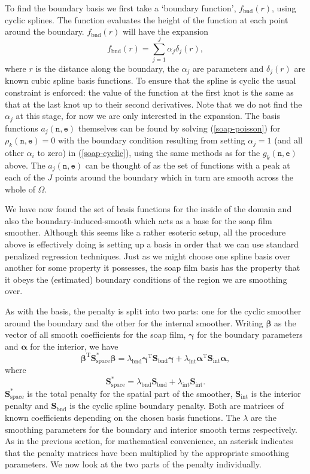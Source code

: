 To find the boundary basis we first take a `boundary function', $f_\text{bnd}(r)$, using cyclic splines. The function evaluates the height of the function at each point around the boundary. $f_\text{bnd}(r)$ will have the expansion
\begin{equation}
f_\text{bnd}(r)=\sum_{j=1}^J \alpha_j \delta_j(r),
\label{soap-cyclic}
\end{equation}
where $r$ is the distance along the boundary, the $\alpha_j$ are parameters and $\delta_j(r)$ are known cubic spline basis functions. To ensure that the spline is cyclic the usual constraint is enforced: the value of the function at the first knot is the same as that at the last knot up to their second derivatives. Note that we do not find the $\alpha_j$ at this stage, for now we are only interested in the expansion. The basis functions $a_j(\texttt{n},\texttt{e})$ themselves can be found by solving (\ref{soap-poisson}) for $\rho_k(\texttt{n},\texttt{e})= 0$ with the boundary condition resulting from setting $\alpha_j=1$ (and all other $\alpha_i$ to zero) in (\ref{soap-cyclic}), using the same methods as for the $g_k(\texttt{n},\texttt{e})$ above. The $a_j(\texttt{n},\texttt{e})$ can be thought of as the set of functions with a peak at each of the $J$ points around the boundary which in turn are smooth across the whole of $\Omega$.

We have now found the set of basis functions for the inside of the domain and also the boundary-induced-smooth which acts as a base for the soap film smoother. Although this seems like a rather esoteric setup, all the procedure above is effectively doing is setting up a basis in order that we can use standard penalized regression techniques. Just as we might choose one spline basis over another for some property it possesses, the soap film basis has the property that it obeys the (estimated) boundary conditions of the region we are smoothing over.

As with the basis, the penalty is split into two parts: one for the cyclic smoother around the boundary and the other for the internal smoother. Writing $\bm\beta$ as the vector of all smooth coefficients for the soap film, $\bm\gamma$ for the boundary parameters and $\bm\alpha$ for the interior, we have
$$
\bm\beta^\text{T}\textbf{S}^*_\text{space}\bm{\beta} = \lambda_\text{bnd} \bm\gamma^\text{T}\textbf{S}_\text{bnd}\bm{\gamma} + \lambda_\text{int} \bm{\alpha}^\text{T}\textbf{S}_\text{int}\bm{\alpha},
$$
where 
$$
\textbf{S}^*_\text{space} = \lambda_\text{bnd} \textbf{S}_\text{bnd} + \lambda_\text{int} \textbf{S}_\text{int}.
$$
$\textbf{S}^*_\text{space}$ is the total penalty for the spatial part of the smoother, $\textbf{S}_\text{int}$ is the interior penalty and $\textbf{S}_\text{bnd}$ is the cyclic spline boundary penalty. Both are matrices of known coefficients depending on the chosen basis functions. The $\lambda$ are the smoothing parameters for the boundary and interior smooth terms respectively. As in the previous section, for mathematical convenience, an asterisk indicates that the penalty matrices have been multiplied by the appropriate smoothing parameters. We now look at the two parts of the penalty individually. 

